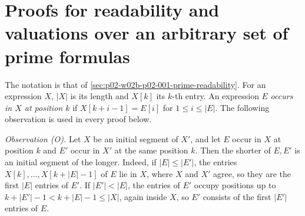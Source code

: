\section{Proofs for readability and valuations over an arbitrary set of prime formulas}
\label{sec:annex-p02-w02b-p02-001-prime-readability}

The notation is that of \cref{sec:p02-w02b-p02-001-prime-readability}.  For
an expression \(X\), \(|X|\) is its length and \(X[k]\) its \(k\)-th entry.
An expression \(E\) \emph{occurs in \(X\) at position \(k\)} if
\(X[k+i-1]=E[i]\) for \(1\leq i\leq|E|\).  The following observation is used
in every proof below.

\emph{Observation (O).}  Let \(X\) be an initial segment of \(X'\), and let
\(E\) occur in \(X\) at position \(k\) and \(E'\) occur in \(X'\) at the same
position \(k\).  Then the shorter of \(E,E'\) is an initial segment of the
longer.  Indeed, if \(|E|\leq|E'|\), the entries
\(X[k],\ldots,X[k+|E|-1]\) of \(E\) lie in \(X\), where \(X\) and \(X'\)
agree, so they are the first \(|E|\) entries of \(E'\).  If \(|E'|<|E|\),
the entries of \(E'\) occupy positions up to \(k+|E'|-1<k+|E|-1\leq|X|\),
again inside \(X\), so \(E'\) consists of the first \(|E'|\) entries of
\(E\).

